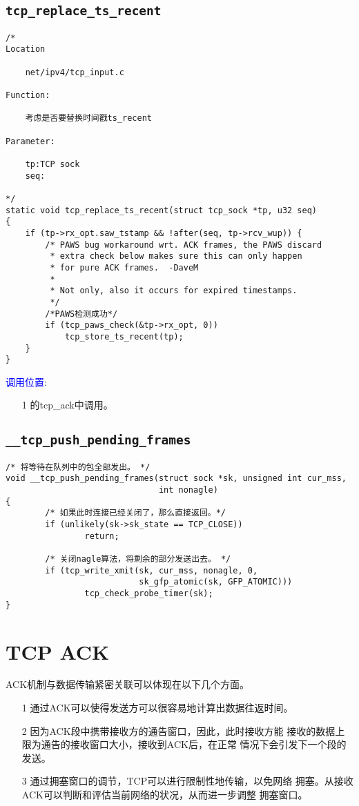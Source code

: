 	\subsection{\texttt{tcp_replace_ts_recent}}
		\label{TCPTimestamp:tcp_replace_ts_recent}
\begin{verbatim}
/*
Location

	net/ipv4/tcp_input.c

Function:

	考虑是否要替换时间戳ts_recent

Parameter:

	tp:TCP sock
	seq:

*/
static void tcp_replace_ts_recent(struct tcp_sock *tp, u32 seq)
{
	if (tp->rx_opt.saw_tstamp && !after(seq, tp->rcv_wup)) {
		/* PAWS bug workaround wrt. ACK frames, the PAWS discard
		 * extra check below makes sure this can only happen
		 * for pure ACK frames.  -DaveM
		 *
		 * Not only, also it occurs for expired timestamps.
		 */
		/*PAWS检测成功*/
		if (tcp_paws_check(&tp->rx_opt, 0))
			tcp_store_ts_recent(tp);
	}
}
\end{verbatim}

		\textcolor{blue}{调用位置}:
			\begin{enumerate}
				\item[1]		\label{ClientReceiveSYN+ACK:tcp_ack}的tcp\_ack中调用。
			\end{enumerate}

    \subsection{\texttt{__tcp_push_pending_frames}}
\begin{verbatim}
/* 将等待在队列中的包全部发出。 */
void __tcp_push_pending_frames(struct sock *sk, unsigned int cur_mss,
                               int nonagle)
{
        /* 如果此时连接已经关闭了，那么直接返回。*/
        if (unlikely(sk->sk_state == TCP_CLOSE))
                return;

        /* 关闭nagle算法，将剩余的部分发送出去。 */
        if (tcp_write_xmit(sk, cur_mss, nonagle, 0,
                           sk_gfp_atomic(sk, GFP_ATOMIC)))
                tcp_check_probe_timer(sk);
}
\end{verbatim}
\section{TCP ACK}
	ACK机制与数据传输紧密关联可以体现在以下几个方面。
\begin{enumerate}
\item[1]	通过ACK可以使得发送方可以很容易地计算出数据往返时间。
\item[2]	因为ACK段中携带接收方的通告窗口，因此，此时接收方能
			接收的数据上限为通告的接收窗口大小，接收到ACK后，在正常
			情况下会引发下一个段的发送。
\item[3]	通过拥塞窗口的调节，TCP可以进行限制性地传输，以免网络
			拥塞。从接收ACK可以判断和评估当前网络的状况，从而进一步调整
			拥塞窗口。
\end{enumerate}
